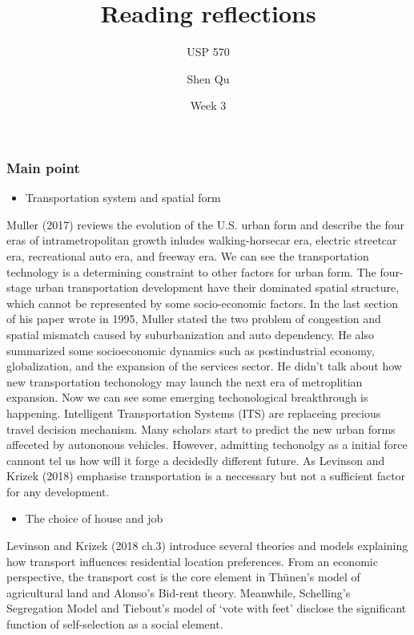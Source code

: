 \documentclass[12pt,]{article}
\title{Reading reflections}
\subtitle{USP 570}
\author{Shen Qu}
\date{Week 3}
\providecommand{\tightlist}{%
  \setlength{\itemsep}{0pt}\setlength{\parskip}{0pt}}
\begin{document}
\maketitle

\hypertarget{main-point}{%
\subsubsection{Main point}\label{main-point}}

\begin{itemize}
\tightlist
\item
  Transportation system and spatial form
\end{itemize}

Muller (2017) reviews the evolution of the U.S. urban form and describe
the four eras of intrametropolitan growth inludes walking-horsecar era,
electric streetcar era, recreational auto era, and freeway era. We can
see the transportation technology is a determining constraint to other
factors for urban form. The four-stage urban transportation development
have their dominated spatial structure, which cannot be represented by
some socio-economic factors. In the last section of his paper wrote in
1995, Muller stated the two problem of congestion and spatial mismatch
caused by suburbanization and auto dependency. He also summarized some
socioeconomic dynamics such as postindustrial economy, globalization,
and the expansion of the services sector. He didn't talk about how new
transportation techonology may launch the next era of metroplitian
expansion. Now we can see some emerging techonological breakthrough is
happening. Intelligent Transportation Systems (ITS) are replaceing
precious travel decision mechanism. Many scholars start to predict the
new urban forms affeceted by autononous vehicles. However, admitting
techonolgy as a initial force cannont tel us how will it forge a
decidedly different future. As Levinson and Krizek (2018) emphasise
transportation is a neccessary but not a sufficient factor for any
development.

\begin{itemize}
\tightlist
\item
  The choice of house and job
\end{itemize}

Levinson and Krizek (2018 ch.3) introduce several theories and models
explaining how transport influences residential location preferences.
From an economic perspective, the transport cost is the core element in
Thünen's model of agricultural land and Alonso's Bid-rent theory.
Meanwhile, Schelling's Segregation Model and Tiebout's model of `vote
with feet' disclose the significant function of self-selection as a
social element.
\end{document}
